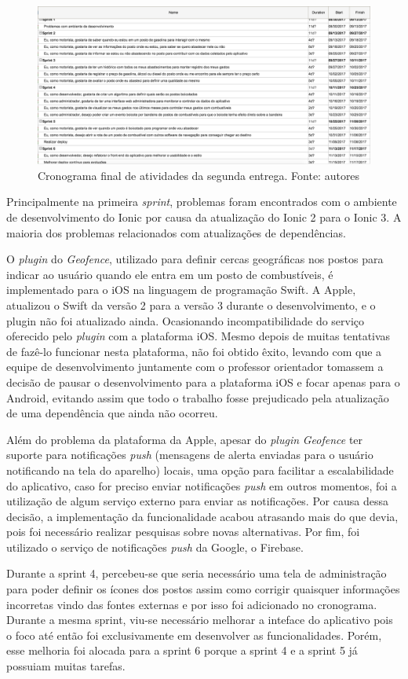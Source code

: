 \begin{figure}[H]
    \centering
    \includegraphics[scale=0.4]{figuras/cronograma_segunda_parte_2.png}
    \caption[Cronograma final de atividades da segunda entrega.]{Cronograma final de atividades da segunda entrega. Fonte: autores}
    \label{img:cronogramafinal}
\end{figure}

Principalmente na primeira \textit{sprint}, problemas foram encontrados com o ambiente de desenvolvimento do Ionic por causa da atualização do Ionic 2 para o Ionic 3. A maioria dos problemas relacionados com atualizações de dependências.

O \textit{plugin} do \textit{Geofence}, utilizado para definir cercas geográficas nos postos para indicar ao usuário quando ele entra em um posto de combustíveis, é implementado para o iOS na linguagem de programação Swift. A Apple, atualizou o Swift da versão 2 para a versão 3 durante o desenvolvimento, e o plugin não foi atualizado ainda. Ocasionando incompatibilidade do serviço oferecido pelo \textit{plugin} com a plataforma iOS. Mesmo depois de muitas tentativas de fazê-lo funcionar nesta plataforma, não foi obtido êxito, levando com que a equipe de desenvolvimento juntamente com o professor orientador tomassem a decisão de pausar o desenvolvimento para a plataforma iOS e focar apenas para o Android, evitando assim que todo o trabalho fosse prejudicado pela atualização de uma dependência que ainda não ocorreu.

Além do problema da plataforma da Apple, apesar do \textit{plugin} \textit{Geofence} ter suporte para notificações \textit{push} (mensagens de alerta enviadas para o usuário notificando na tela do aparelho) locais, uma opção para facilitar a escalabilidade do aplicativo, caso for preciso enviar notificações \textit{push} em outros momentos, foi a utilização de algum serviço externo para enviar as notificações. Por causa dessa decisão, a implementação da funcionalidade acabou atrasando mais do que devia, pois foi necessário realizar pesquisas sobre novas alternativas. Por fim, foi utilizado o serviço de notificações \textit{push} da Google, o Firebase.

Durante a sprint 4, percebeu-se que seria necessário uma tela de administração para poder definir os ícones dos postos assim como corrigir quaisquer informações incorretas vindo das fontes externas e por isso foi adicionado no cronograma. Durante a mesma sprint, viu-se necessário melhorar a inteface do aplicativo pois o foco até então foi exclusivamente em desenvolver as funcionalidades. Porém, esse melhoria foi alocada para a sprint 6 porque a sprint 4 e a sprint 5 já possuiam muitas tarefas.
